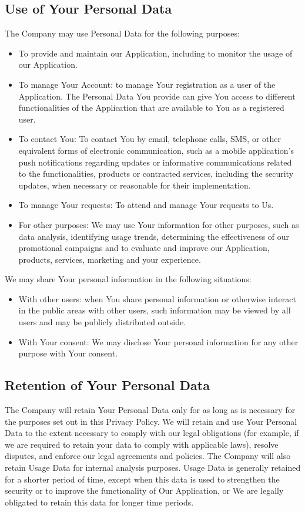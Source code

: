 \documentclass{article}
\begin{document}
\subsection*{Use of Your Personal Data}
The Company may use Personal Data for the following purposes:\newline
\begin{itemize}
    \item To provide and maintain our Application, including to monitor the usage of our Application.
    \item To manage Your Account: to manage Your registration as a user of the Application. The Personal Data You provide can give You access to different functionalities of the Application that are available to You as a registered user.
    \item To contact You: To contact You by email, telephone calls, SMS, or other equivalent forms of electronic communication, such as a mobile application's push notifications regarding updates or informative communications related to the functionalities, products or contracted services, including the security updates, when necessary or reasonable for their implementation.
    \item To manage Your requests: To attend and manage Your requests to Us.
    \item For other purposes: We may use Your information for other purposes, such as data analysis, identifying usage trends, determining the effectiveness of our promotional campaigns and to evaluate and improve our Application, products, services, marketing and your experience.
\end{itemize}
We may share Your personal information in the following situations:
\begin{itemize}
    \item With other users: when You share personal information or otherwise interact in the public areas with other users, such information may be viewed by all users and may be publicly distributed outside.
    \item With Your consent: We may disclose Your personal information for any other purpose with Your consent.
\end{itemize}
\subsection*{Retention of Your Personal Data}
The Company will retain Your Personal Data only for as long as is necessary for the purposes set out in this Privacy Policy. We will retain and use Your Personal Data to the extent necessary to comply with our legal obligations (for example, if we are required to retain your data to comply with applicable laws), resolve disputes, and enforce our legal agreements and policies.\newline
The Company will also retain Usage Data for internal analysis purposes. Usage Data is generally retained for a shorter period of time, except when this data is used to strengthen the security or to improve the functionality of Our Application, or We are legally obligated to retain this data for longer time periods.\newline
\end{document}
